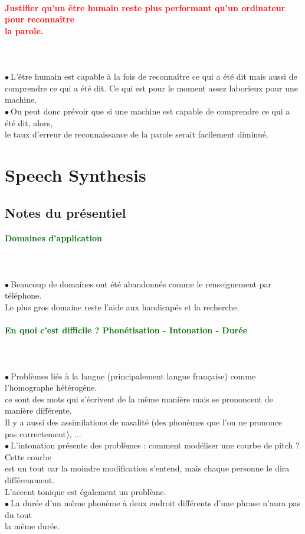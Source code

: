 \documentclass[letterpaper, 12pt]{article}
\newcommand{\alinea}{
\hspace*{0.3cm}}
\newcommand{\red}[1]{
	\textcolor{red}{#1}
}
\newcommand{\green}[1]{
	\textcolor{darkgreen}{#1}
}
\newcommand{\point}{$\bullet\ $}
\begin{document}
		\paragraph{\red{Justifier qu'un être humain reste plus performant qu'un ordinateur pour reconnaître 
		~\\ \hspace*{0.035cm} la parole.}}~\\~\\
			\point L'être humain est capable à la fois de reconnaître ce qui a été dit mais aussi de 
				\\\alinea comprendre ce qui a été dit. Ce qui est pour le moment assez laborieux pour une machine.\\
			\point On peut donc prévoir que si une machine est capable de comprendre ce qui a été dit, alors,
				\\\alinea le taux d'erreur de reconnaissance de la parole serait facilement diminué.
\pagebreak
\section{Speech Synthesis}
	\subsection{Notes du présentiel}
		\paragraph{\green{Domaines d'application}}~\\~\\
			\point Beaucoup de domaines ont été abandonnés comme le renseignement par téléphone. 
				\\\alinea Le plus gros domaine reste l'aide aux handicapés et la recherche.
		\paragraph{\green{En quoi c'est difficile ? Phonétisation - Intonation - Durée}}~\\~\\
			\point Problèmes liés à la langue (principalement langue française) comme l'homographe hétérogène.
				\\\alinea ce sont des mots qui s'écrivent de la même manière mais se prononcent de manière différente.
				\\\alinea Il y a aussi des assimilations de nasalité (des phonèmes que l'on ne prononce
				\\\alinea pas correctement), ...\\
			\point L'intonation présente des problèmes : comment modéliser une courbe de pitch ? Cette courbe
				\\\alinea est un tout car la moindre modification s'entend, mais chaque personne le dira différemment.
				\\\alinea L'accent tonique est également un problème.\\
			\point La durée d'un même phonème à deux endroit différents d'une phrase n'aura pas du tout
				\\\alinea la même durée.
\end{document}
